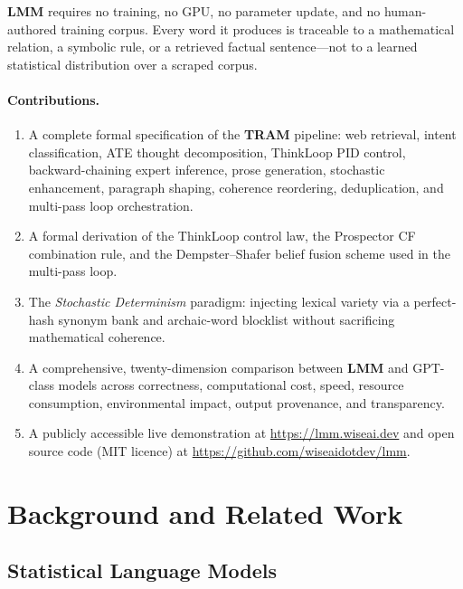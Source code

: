 \documentclass[11pt,a4paper]{article}
\newcommand{\lmm}{\texorpdfstring{%
  \textbf{\color{lmmAccent}LMM}}{LMM}}
\newcommand{\tram}{\texorpdfstring{%
  \textbf{\color{lmmTeal}TRAM}}{TRAM}}
\begin{document}
\lmm{} requires no training, no GPU, no parameter update, and no human-authored training corpus.
Every word it produces is traceable to a mathematical relation, a symbolic rule, or a retrieved
factual sentence---not to a learned statistical distribution over a scraped corpus.

\paragraph{Contributions.}
\begin{enumerate}[noitemsep,topsep=4pt]
  \item A complete formal specification of the \tram{} pipeline: web retrieval, intent
        classification, ATE thought decomposition, ThinkLoop PID control, backward-chaining expert
        inference, prose generation, stochastic enhancement, paragraph shaping, coherence
        reordering, deduplication, and multi-pass loop orchestration.
  \item A formal derivation of the ThinkLoop control law, the Prospector CF combination rule, and
        the Dempster--Shafer belief fusion scheme used in the multi-pass loop.
  \item The \textit{Stochastic Determinism} paradigm: injecting lexical variety via a perfect-hash
        synonym bank and archaic-word blocklist without sacrificing mathematical coherence.
  \item A comprehensive, twenty-dimension comparison between \lmm{} and GPT-class models across
        correctness, computational cost, speed, resource consumption, environmental impact, output
        provenance, and transparency.
  \item A publicly accessible live demonstration at \url{https://lmm.wiseai.dev} and open source
        code (MIT licence) at \url{https://github.com/wiseaidotdev/lmm}.
\end{enumerate}

\section{Background and Related Work}
\label{sec:related}

\subsection{Statistical Language Models}
\end{document}
